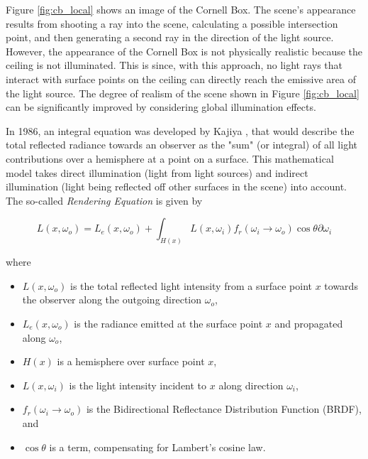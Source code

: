 Figure \ref{fig:cb_local} shows an image of the Cornell Box. The scene's appearance results from shooting a ray into the scene, calculating a possible intersection point, and then generating a second ray in the direction of the light source. However, the appearance of the Cornell Box is not physically realistic because the ceiling is not illuminated. This is since, with this approach, no light rays that interact with surface points on the ceiling can directly reach the emissive area of the light source. The degree of realism of the scene shown in Figure \ref{fig:cb_local} can be significantly improved by considering global illumination effects. 

In 1986, an integral equation was developed by Kajiya \cite{kajiya1986rendering}, that would describe the total reflected radiance towards an observer as the "sum" (or integral) of all light contributions over a hemisphere at a point on a surface. This mathematical model takes direct illumination (light from light sources) and indirect illumination (light being reflected off other surfaces in the scene) into account.
\\

The so-called \emph{Rendering Equation} is given by

\begin{equation}\label{eq:renderingeq}
L(x, \omega_{o}) = L_{e}(x, \omega_{o}) + \int_{H(x)} L(x, \omega_{i})f_{r}(\omega_{i} \rightarrow \omega_{o})\cos\theta\partial\omega_{i}
\end{equation}

\noindent where
\begin{itemize}
	\setlength\itemsep{0.05em}
	\item  $L(x, \omega_{o})$ is the total reflected light intensity from a surface point $x$ towards the observer along the outgoing direction $\omega_{o}$,
	\item  $L_{e}(x, \omega_{o})$ is the radiance emitted at the surface point $x$ and propagated along $\omega_{o}$,
	\item  $H(x)$ is a hemisphere over surface point $x$,
	\item 	$L(x, \omega_{i})$ is the light intensity incident to $x$ along direction $\omega_{i}$, 
	\item  $f_{r}(\omega_{i} \rightarrow \omega_{o})$ is the Bidirectional Reflectance Distribution Function (BRDF), and 
	\item  $\cos\theta$ is a term, compensating for Lambert's cosine law.
\end{itemize}


